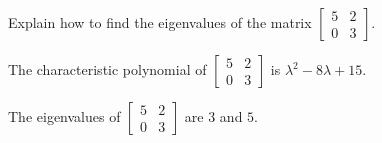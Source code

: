 
\begin{exerciseStatement}


Explain how to find the eigenvalues of the matrix \( \left[\begin{array}{cc}
5 & 2 \\
0 & 3
\end{array}\right] \).


\end{exerciseStatement}
    
\begin{exerciseAnswer} 


The characteristic polynomial of \( \left[\begin{array}{cc}
5 & 2 \\
0 & 3
\end{array}\right] \) is \( \lambda^{2} - 8 \lambda + 15 \).



The eigenvalues of \( \left[\begin{array}{cc}
5 & 2 \\
0 & 3
\end{array}\right] \) are \( 3 \) and \( 5 \).


\end{exerciseAnswer}
    
